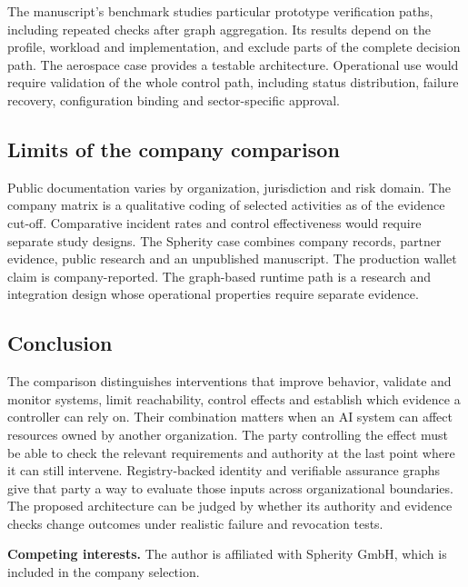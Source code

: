 The manuscript's benchmark studies particular prototype verification paths, including repeated checks after graph aggregation. Its results depend on the profile, workload and implementation, and exclude parts of the complete decision path. The aerospace case provides a testable architecture. Operational use would require validation of the whole control path, including status distribution, failure recovery, configuration binding and sector-specific approval.~\cite{src6,src15}

\subsection{Limits of the company comparison}

Public documentation varies by organization, jurisdiction and risk domain. The company matrix is a qualitative coding of selected activities as of the evidence cut-off. Comparative incident rates and control effectiveness would require separate study designs. The Spherity case combines company records, partner evidence, public research and an unpublished manuscript. The production wallet claim is company-reported. The graph-based runtime path is a research and integration design whose operational properties require separate evidence.

\subsection{Conclusion}

The comparison distinguishes interventions that improve behavior, validate and monitor systems, limit reachability, control effects and establish which evidence a controller can rely on. Their combination matters when an AI system can affect resources owned by another organization. The party controlling the effect must be able to check the relevant requirements and authority at the last point where it can still intervene. Registry-backed identity and verifiable assurance graphs give that party a way to evaluate those inputs across organizational boundaries. The proposed architecture can be judged by whether its authority and evidence checks change outcomes under realistic failure and revocation tests.

\textbf{Competing interests.} The author is affiliated with Spherity GmbH, which is included in the company selection.
